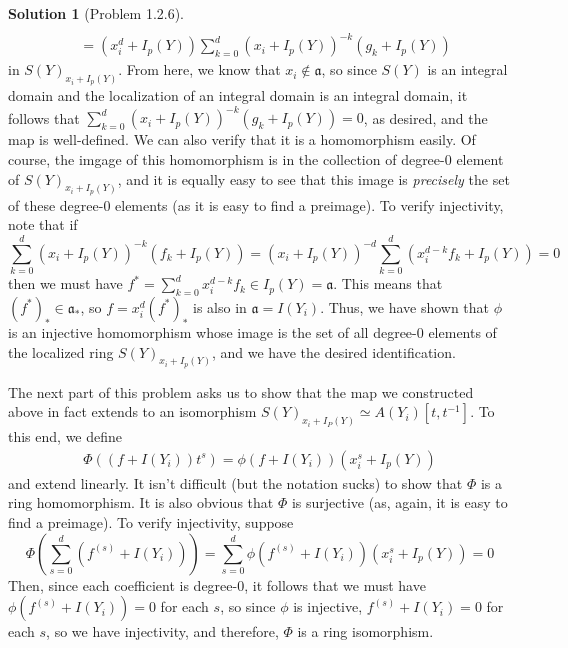 \documentclass[aps,pra,showpacs,notitlepage,onecolumn,superscriptaddress,nofootinbib]{revtex4-1}
\theoremstyle{definition}
\newtheorem{solution}{Solution}[section]
\begin{document}
\begin{solution}[Problem 1.2.6]
\begin{align}
    \\ &= (x_i^{d} + I_p(Y)) \sum_{k = 0}^{d} (x_i + I_p(Y))^{-k} (g_k + I_p(Y))
    \end{align}
  in $S(Y)_{x_i + I_p(Y)}$. From here, we know that $x_i \notin \mathfrak{a}$, so since $S(Y)$ is an integral domain and the localization of an integral domain is an integral domain,
  it follows that $\sum_{k = 0}^{d} (x_i + I_p(Y))^{-k} (g_k + I_p(Y)) = 0$, as desired, and the map
  is well-defined. We can also verify that it is a homomorphism easily. Of course, the imgage of this homomorphism is in the collection of degree-$0$ element of
  $S(Y)_{x_i + I_p(Y)}$, and it is equally easy to see that this image is \emph{precisely} the set of these degree-$0$ elements (as it is easy to find a preimage). To verify injectivity, note that if
  \begin{equation}
    \sum_{k = 0}^{d} (x_i + I_p(Y))^{-k} (f_k + I_p(Y)) = (x_i + I_p(Y))^{-d} \sum_{k = 0}^{d} (x_i^{d - k} f_k + I_p(Y)) = 0
    \end{equation}
  then we must have $f^{*} = \sum_{k = 0}^{d} x_i^{d - k} f_k \in I_p(Y) = \mathfrak{a}$. This means that $(f^{*})_{*} \in \mathfrak{a}_{*}$, so $f = x_i^{d} (f^{*})_{*}$ is also in $\mathfrak{a} = I(Y_i)$.
  Thus, we have shown that $\phi$ is an injective homomorphism whose image is the set of all degree-$0$ elements of the localized ring $S(Y)_{x_i + I_p(Y)}$, and we have the desired identification.
  
  The next part of this problem asks us to show that the map we constructed above in fact extends to an isomorphism $S(Y)_{x_i + I_P(Y)} \simeq A(Y_i)[t, t^{-1}]$.
  To this end, we define
  \begin{align}
    \Phi((f + I(Y_i)) t^s) = \phi(f + I(Y_i)) (x_i^{s} + I_p(Y))
  \end{align}
  and extend linearly. It isn't difficult (but the notation sucks) to show that $\Phi$ is a ring homomorphism. It is also obvious that $\Phi$ is surjective (as, again, it is easy to find a preimage).
  To verify injectivity, suppose
  \begin{equation}
    \Phi \left( \sum_{s = 0}^{d} (f^{(s)} + I(Y_i)) \right) = \sum_{s = 0}^{d} \phi(f^{(s)} + I(Y_i)) (x_i^{s} + I_p(Y)) = 0
    \end{equation}
  Then, since each coefficient is degree-$0$, it follows that we must have $\phi(f^{(s)} + I(Y_i)) = 0$ for each $s$, so since $\phi$ is injective, $f^{(s)} + I(Y_i) = 0$ for
  each $s$, so we have injectivity, and therefore, $\Phi$ is a ring isomorphism.


\end{solution}
\end{document}
